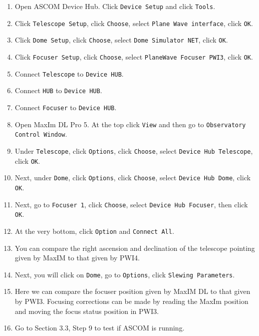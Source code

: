 \documentclass{article}
\begin{document}
	\begin{enumerate}
		\item Open ASCOM Device Hub. Click \texttt{Device Setup} and click \texttt{Tools}.
		
		\item Click \texttt{Telescope Setup}, click \texttt{Choose}, select \texttt{Plane Wave interface}, click \texttt{OK}.
		
		\item Click \texttt{Dome Setup}, click \texttt{Choose}, select \texttt{Dome Simulator NET}, click \texttt{OK}. 
		
		\item Click \texttt{Focuser Setup}, click \texttt{Choose}, select \texttt{PlaneWave Focuser PWI3}, click \texttt{OK}. 
		
		\item Connect \texttt{Telescope} to \texttt{Device HUB}. 
		
		\item Connect \texttt{HUB} to \texttt{Device HUB}. 
		
		\item Connect \texttt{Focuser} to \texttt{Device HUB}. 
		
		\item Open MaxIm DL Pro 5. At the top click \texttt{View} and then go to \texttt{Observatory Control Window}. 
		
		\item Under \texttt{Telescope}, click \texttt{Options}, click \texttt{Choose}, select \texttt{Device Hub Telescope}, click \texttt{OK}. 
		
		\item Next, under \texttt{Dome}, click \texttt{Options}, click \texttt{Choose}, select \texttt{Device Hub Dome}, click \texttt{OK}. 
		
		\item Next, go to \texttt{Focuser 1}, click \texttt{Choose}, select \texttt{Device Hub Focuser}, then click \texttt{OK}. 
		
		\item At the very bottom, click \texttt{Option} and \texttt{Connect All}. 
		
		\item You can compare the right ascension and declination of the telescope pointing given by MaxIM to that given by PWI4. 
		
		\item Next, you will click on \texttt{Dome}, go to \texttt{Options}, click \texttt{Slewing Parameters}.
		
		\item Here we can compare the focuser position given by MaxIM DL to that given by PWI3. Focusing corrections can be made by reading the MaxIm position and moving the focus status position in PWI3.
		
		\item Go to Section 3.3, Step 9 to test if ASCOM is running. 
		
	\end{enumerate}
	
\end{document}
